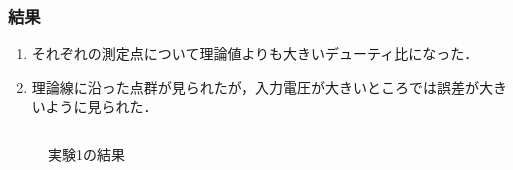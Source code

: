 \documentclass[mathsans]{beamer} %
\begin{document}
\begin{frame}
	\frametitle{結果}
	\begin{enumerate}[実験\arabic*.]
		\item それぞれの測定点について理論値よりも大きいデューティ比になった．
		\item 理論線に沿った点群が見られたが，入力電圧が大きいところでは誤差が大きいように見られた．
	\end{enumerate}
	\begin{columns}
		\begin{column}{.5\linewidth}
			\begin{figure}[htbp]
				\begin{center}
					\caption{実験1の結果}\label{fig:exp_add_comp}
				\end{center}
			\end{figure}
		\end{column}
		\begin{column}{.5\linewidth}
			\begin{figure}
				\begin{center}

\end{center}
\end{figure}
\end{column}
\end{columns}
\end{frame}
\end{document}

